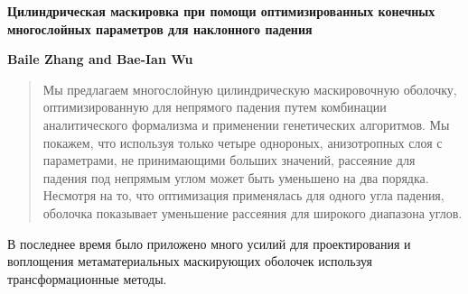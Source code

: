 \documentclass[a4paper, 12pt]{article}
\newcommand{\tit}[1]{\begin{center}{\bf{\Large #1}}\end{center}}
\newcommand{\aut}[1]{\centerline{{\bf #1}}}
\begin{document}
\sloppy
 \tit{Цилиндрическая маскировка при помощи оптимизированных конечных многослойных параметров для наклонного падения}
 \aut{Baile Zhang and Bae-Ian Wu}

\begin{abstract}
Мы предлагаем многослойную цилиндрическую маскировочную оболочку, оптимизированную для непрямого падения путем комбинации аналитического формализма и применении генетических алгоритмов. 
Мы покажем, что используя только четыре однороных, анизотропных слоя с параметрами, не принимающими больших значений, рассеяние для падения под непрямым углом может быть уменьшено на 
два порядка. Несмотря на то, что оптимизация применялась для одного угла падения, оболочка показывает уменьшение рассеяния для широкого диапазона углов.
\end{abstract}

В последнее время было приложено много усилий для проектирования и воплощения метаматериальных 
маскирующих оболочек используя трансформационные методы. 

\end{document}
